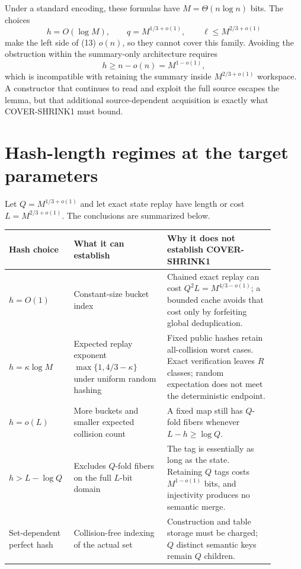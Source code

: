 \documentclass[11pt]{article}
\begin{document}
Under a standard encoding, these formulas have $M=\Theta(n\log n)$ bits.
The choices
\[
 h=O(\log M),\qquad q=M^{1/3+o(1)},
 \qquad \ell\le M^{2/3+o(1)}
\]
make the left side of (13) $o(n)$, so they cannot cover this family.  Avoiding
the obstruction within the summary-only architecture requires
\[
 h\ge n-o(n)=M^{1-o(1)},
\]
which is incompatible with retaining the summary inside
$M^{2/3+o(1)}$ workspace.  A constructor that continues to read and exploit
the full source escapes the lemma, but that additional source-dependent
acquisition is exactly what COVER-SHRINK1 must bound.

\section{Hash-length regimes at the target parameters}

Let $Q=M^{1/3+o(1)}$ and let exact state replay have length or cost
$L=M^{2/3+o(1)}$.  The conclusions are summarized below.

\begin{center}
\small
\begin{tabular}{p{0.18\linewidth}p{0.33\linewidth}p{0.38\linewidth}}
\toprule
Hash choice & What it can establish & Why it does not establish COVER-SHRINK1 \\
\midrule
$h=O(1)$ & Constant-size bucket index & Chained exact replay can cost
$Q^2L=M^{4/3-o(1)}$; a bounded cache avoids that cost only by forfeiting
global deduplication. \\
\addlinespace
$h=\kappa\log M$ & Expected replay exponent
$\max\{1,4/3-\kappa\}$ under uniform random hashing & Fixed public hashes
retain all-collision worst cases.  Exact verification leaves $R$ classes;
random expectation does not meet the deterministic endpoint. \\
\addlinespace
$h=o(L)$ & More buckets and smaller expected collision count & A fixed map
still has $Q$-fold fibers whenever $L-h\ge\log Q$. \\
\addlinespace
$h>L-\log Q$ & Excludes $Q$-fold fibers on the full $L$-bit domain & The tag
is essentially as long as the state.  Retaining $Q$ tags costs
$M^{1-o(1)}$ bits, and injectivity produces no semantic merge. \\
\addlinespace
Set-dependent perfect hash & Collision-free indexing of the actual set &
Construction and table storage must be charged; $Q$ distinct semantic keys
remain $Q$ children. \\
\bottomrule
\end{tabular}
\end{center}
\end{document}
